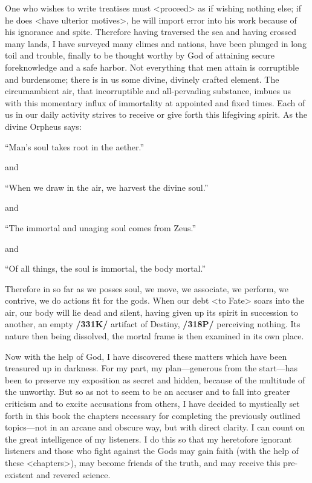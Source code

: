 One who wishes to write treatises must <proceed> as if wishing nothing else; if he does <have ulterior motives>, he will import error into his work because of his ignorance and spite. Therefore having traversed the sea and having crossed many lands, I have surveyed many climes and nations, have been plunged in long toil and trouble, finally to be thought worthy by God of attaining secure foreknowledge and a safe harbor. Not everything that men attain is corruptible and burdensome; there is in us some divine, divinely crafted element. The circumambient air, that incorruptible and all-pervading substance, imbues us with this momentary influx of immortality at appointed and fixed times. Each of us in our daily activity strives to receive or give forth this lifegiving spirit. As the divine Orpheus says:

“Man’s soul takes root in the aether.”

and

“When we draw in the air, we harvest the divine soul.”

and

“The immortal and unaging soul comes from Zeus.”

and

“Of all things, the soul is immortal, the body mortal.”

Therefore in so far as we posses soul, we move, we associate, we perform, we contrive, we do actions fit for the gods. When our debt <to Fate> soars into the air, our body will lie dead and silent, having given up its spirit in succession to another, an empty \textbf{/331K/} artifact of Destiny, \textbf{/318P/} perceiving nothing. Its nature then being dissolved, the mortal frame is then examined in its own place.

Now with the help of God, I have discovered these matters which have been treasured up in darkness. For my part, my plan—generous from the start—has been to preserve my exposition as secret and hidden,
because of the multitude of the unworthy. But so as not to seem to be an accuser and to fall into greater criticism and to excite accusations from others, I have decided to mystically set forth in this book the
chapters necessary for completing the previously outlined topics—not in an arcane and obscure way, but with direct clarity. I can count on the great intelligence of my listeners. I do this so that my heretofore
ignorant listeners and those who fight against the Gods may gain faith (with the help of these <chapters>), may become friends of the truth, and may receive this pre-existent and revered science.
\newpage